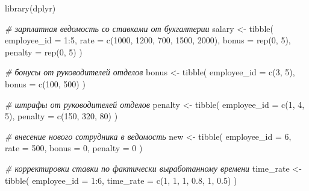 \documentclass[
]{book}
\newenvironment{Shaded}{\begin{snugshade}}{\end{snugshade}}
\newcommand{\AttributeTok}[1]{\textcolor[rgb]{0.77,0.63,0.00}{#1}}
\newcommand{\CommentTok}[1]{\textcolor[rgb]{0.56,0.35,0.01}{\textit{#1}}}
\newcommand{\DecValTok}[1]{\textcolor[rgb]{0.00,0.00,0.81}{#1}}
\newcommand{\FloatTok}[1]{\textcolor[rgb]{0.00,0.00,0.81}{#1}}
\newcommand{\FunctionTok}[1]{\textcolor[rgb]{0.00,0.00,0.00}{#1}}
\newcommand{\NormalTok}[1]{#1}
\newcommand{\OtherTok}[1]{\textcolor[rgb]{0.56,0.35,0.01}{#1}}
\newcommand{\SpecialCharTok}[1]{\textcolor[rgb]{0.00,0.00,0.00}{#1}}
\begin{document}
\begin{Shaded}
\begin{Highlighting}[]
\FunctionTok{library}\NormalTok{(dplyr)}

\CommentTok{\# зарплатная ведомость со ставками от бухгалтерии}
\NormalTok{salary }\OtherTok{\textless{}{-}} \FunctionTok{tibble}\NormalTok{(}
  \AttributeTok{employee\_id =} \DecValTok{1}\SpecialCharTok{:}\DecValTok{5}\NormalTok{,}
  \AttributeTok{rate        =} \FunctionTok{c}\NormalTok{(}\DecValTok{1000}\NormalTok{, }\DecValTok{1200}\NormalTok{, }\DecValTok{700}\NormalTok{, }\DecValTok{1500}\NormalTok{, }\DecValTok{2000}\NormalTok{),}
  \AttributeTok{bonus       =} \FunctionTok{rep}\NormalTok{(}\DecValTok{0}\NormalTok{, }\DecValTok{5}\NormalTok{),}
  \AttributeTok{penalty     =} \FunctionTok{rep}\NormalTok{(}\DecValTok{0}\NormalTok{, }\DecValTok{5}\NormalTok{)}
\NormalTok{)}

\CommentTok{\# бонусы от руководителей отделов}
\NormalTok{bonus }\OtherTok{\textless{}{-}} \FunctionTok{tibble}\NormalTok{(}
  \AttributeTok{employee\_id =} \FunctionTok{c}\NormalTok{(}\DecValTok{3}\NormalTok{, }\DecValTok{5}\NormalTok{),}
  \AttributeTok{bonus =} \FunctionTok{c}\NormalTok{(}\DecValTok{100}\NormalTok{, }\DecValTok{500}\NormalTok{)}
\NormalTok{)}

\CommentTok{\# штрафы от руководителей отделов}
\NormalTok{penalty }\OtherTok{\textless{}{-}} \FunctionTok{tibble}\NormalTok{(}
  \AttributeTok{employee\_id =} \FunctionTok{c}\NormalTok{(}\DecValTok{1}\NormalTok{, }\DecValTok{4}\NormalTok{, }\DecValTok{5}\NormalTok{),}
  \AttributeTok{penalty =} \FunctionTok{c}\NormalTok{(}\DecValTok{150}\NormalTok{, }\DecValTok{320}\NormalTok{, }\DecValTok{80}\NormalTok{)}
\NormalTok{)}

\CommentTok{\# внесение нового сотрудника в ведомость}
\NormalTok{new }\OtherTok{\textless{}{-}} \FunctionTok{tibble}\NormalTok{(}
  \AttributeTok{employee\_id =} \DecValTok{6}\NormalTok{,}
  \AttributeTok{rate =} \DecValTok{500}\NormalTok{,}
  \AttributeTok{bonus =} \DecValTok{0}\NormalTok{,}
  \AttributeTok{penalty =} \DecValTok{0}
\NormalTok{)}

\CommentTok{\# корректировки ставки по фактически выработанному времени}
\NormalTok{time\_rate }\OtherTok{\textless{}{-}} \FunctionTok{tibble}\NormalTok{(}
  \AttributeTok{employee\_id =} \DecValTok{1}\SpecialCharTok{:}\DecValTok{6}\NormalTok{, }
  \AttributeTok{time\_rate =} \FunctionTok{c}\NormalTok{(}\DecValTok{1}\NormalTok{, }\DecValTok{1}\NormalTok{, }\DecValTok{1}\NormalTok{, }\FloatTok{0.8}\NormalTok{, }\DecValTok{1}\NormalTok{, }\FloatTok{0.5}\NormalTok{)}
\NormalTok{)}
\end{Highlighting}
\end{Shaded}
\end{document}
